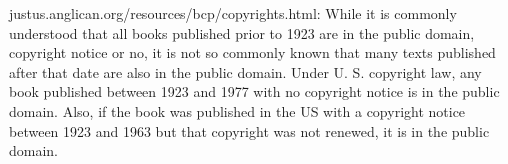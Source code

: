 \documentclass[pottvopaper,11pt,twoside,openany,extrafontsizes,draft]{memoir}
\begin{document}

justus.anglican.org/resources/bcp/copyrights.html:
While it is commonly understood that all books published prior to 1923 are in the public domain, copyright notice or no, it is not so commonly known that many texts published after that date are also in the public domain. Under U. S. copyright law, any book published between 1923 and 1977 with no copyright notice is in the public domain. Also, if the book was published in the US with a copyright notice between 1923 and 1963 but that copyright was not renewed, it is in the public domain.

% 
\end{document}

